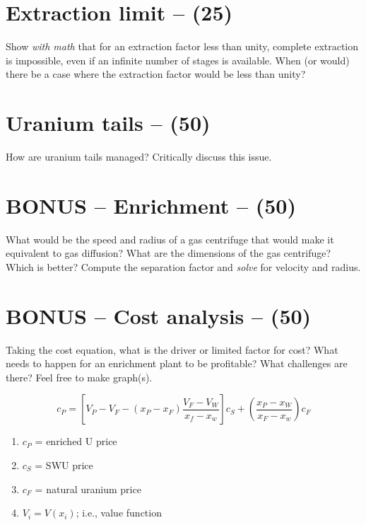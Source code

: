 \documentclass[11pt,a4paper]{article}
\begin{document}
\section{Extraction limit -- (25)}
Show \textit{with math} that for an extraction factor less than unity, complete extraction is impossible, even if an infinite number of stages is available. When (or would) there be a case where the extraction factor would be less than unity?





\newpage

\section{Uranium tails -- (50)}
How are uranium tails managed? Critically discuss this issue.





\newpage

\section{BONUS -- Enrichment -- (50)}
What would be the speed and radius of a gas centrifuge that would make it equivalent to gas diffusion? What are the dimensions of the gas centrifuge? Which is better? Compute the separation factor and \textit{solve} for velocity and radius.







\newpage

\section{BONUS -- Cost analysis -- (50)}
Taking the cost equation, what is the driver or limited factor for cost? What needs to happen for an enrichment plant to be profitable? What challenges are there? Feel free to make graph(s).

\begin{equation}
    c_P = [V_P - V_F - (x_P-x_F) \frac{V_F-V_W}{x_f-x_w}] c_S + (\frac{x_P-x_W}{x_F-x_w}) c_F
\end{equation}

\begin{enumerate}
    \item[]$c_P$ = enriched U price
    \item[]$c_S$ = SWU price
    \item[]$c_F$ = natural uranium price
    \item[]$V_i = V(x_i)$; i.e., value function
\end{enumerate}
\end{document}
